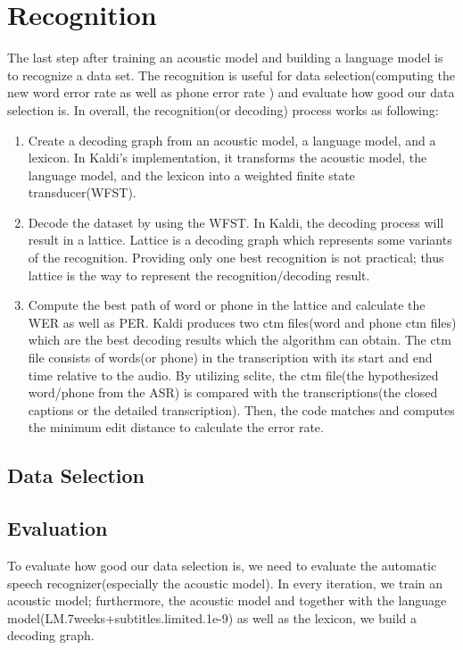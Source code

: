 \section{Recognition}
The last step after training an acoustic model and building a language model is to recognize a data set. The recognition is useful for data selection(computing the new word error rate as well as phone error rate ) and evaluate how good our data selection is. In overall, the recognition(or decoding) process works as following:
\begin{enumerate}
\item Create a decoding graph from an acoustic model, a language model, and a lexicon. In Kaldi's implementation, it transforms the  acoustic model, the language model, and the lexicon into a weighted finite state transducer(WFST).
\item Decode the dataset by using the WFST. In Kaldi, the decoding process will result in a lattice. Lattice is a decoding graph which represents some variants of the recognition. Providing only one best recognition is not practical; thus lattice is the way to represent the recognition/decoding result. 
\item Compute the best path of word or phone in the lattice and calculate the WER as well as PER. Kaldi produces two ctm files(word and phone ctm files) which are the best decoding results which the algorithm can obtain. The ctm file consists of words(or phone) in the transcription with its start and end time relative to the audio. By utilizing sclite, the ctm file(the hypothesized word/phone from the ASR) is compared with the transcriptions(the closed captions or the detailed transcription). Then, the code matches and computes the minimum edit distance to calculate the error rate.
\end{enumerate}

\subsection{Data Selection}



\subsection{Evaluation}
To evaluate how good our data selection is, we need to evaluate the automatic speech recognizer(especially the acoustic model). In every iteration, we train an acoustic model; furthermore, the acoustic model and together with the language model(LM.7weeks+subtitles.limited.1e-9) as well as the lexicon, we build a decoding graph. 

